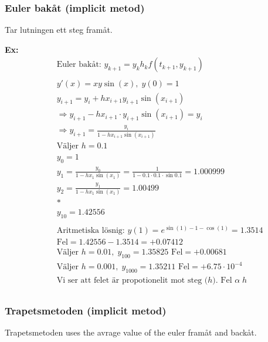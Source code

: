 \subsubsection{Euler bakåt (implicit metod)}
Tar lutningen ett steg framåt.

\textbf{Ex:}
\begin{align*}
  &\quad  \text{Euler bakåt: } y_{k+1} = y_k h_kf(t_{k+1},y_{k+1}) \\
  &\quad  \\
  &\quad  y'(x) = xy\sin{(x)}, \; y(0)=1 \\
  &\quad  y_{i+1} = y_i + hx_{i+1}y_{i+1}\sin{(x_{i+1})} \\
  &\quad  \Rightarrow y_{i+1} -hx_{i+1}\cdot{y_{i+1}}\sin{(x_{i+1})} = y_i \\
  &\quad  \Rightarrow y_{i+1} = \frac{y_i}{1 -hx_{i+1}\sin{(x_{i+1})}} \\
  &\quad  \text{Väljer $h=0.1$} \\
  &\quad  y_0 = 1 \\
  &\quad  y_1 = \frac{y_0}{1 -hx_{1}\sin{(x_{1})}} = \frac{1}{1 -0.1\cdot0.1\cdot\sin{0.1}}
        = 1.000999 \\
  &\quad  y_2 = \frac{y_1}{1 -hx_{1}\sin{(x_{1})}} = 1.00499 \\
  &\quad  * \\
  &\quad  y_{10} = 1.42556 \\
  &\quad  \\
  &\quad  \text{Aritmetiska lösnig: } y(1)=e^{\sin{(1)-1-\cos{(1)}}} = 1.3514 \\
  &\quad  \text{Fel} = 1.42556-1.3514 = +0.07412 \\
  &\quad  \text{Väljer } h=0.01, \; y_{100} = 1.35825 \text{ Fel} = +0.00681 \\
  &\quad  \text{Väljer } h=0.001, \; y_{1000} = 1.35211 \text{ Fel} = +6.75\cdot10^{-4} \\
  &\quad  \text{Vi ser att felet är propotionelit mot steg ($h$). Fel } \alpha \; h \\
\end{align*}

\subsubsection{Trapetsmetoden (implicit metod)}
Trapetsmetoden uses the avrage value of the euler framåt and backåt.

